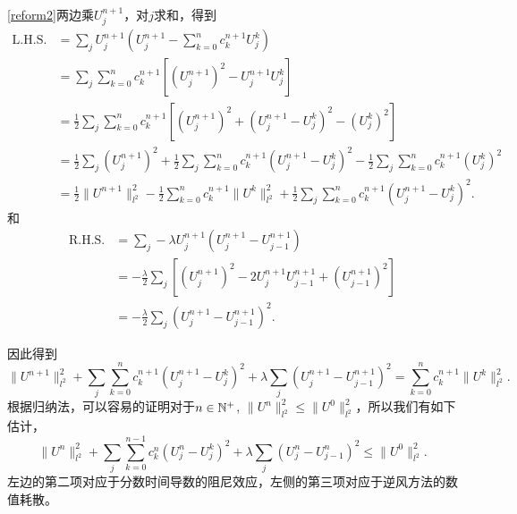 \eqref{reform2}两边乘$U_j^{n+1}$，对$j$求和，得到
\begin{align*}
\mbox{L.H.S.} &=\sum_j  U_j^{n+1} \left( U_j^{n+1}-\sum_{k=0}^{n} c^{n+1}_k U_j^k \right) \\
&= \sum_j \sum_{k=0}^{n} c^{n+1}_k  \left[ \left( U_j^{n+1} \right)^2 -U_j^{n+1}U_j^{k}  \right] \\
&= \frac{1}{2} \sum_j \sum_{k=0}^{n}  c^{n+1}_k   \left[ \left( U_j^{n+1} \right)^2 + \left( U_j^{n+1}-U_j^{k} \right)^2 -  \left( U_j^{k} \right)^2  \right] \\
& = \frac{1}{2}  \sum_j \left( U_j^{n+1} \right)^2 + \frac{1}{2} \sum_j \sum_{k=0}^{n} c^{n+1}_k \left( U_j^{n+1}-U_j^{k} \right)^2 -  \frac{1}{2} \sum_j \sum_{k=0}^{n}  c^{n+1}_k \left( U_j^{k} \right)^2  \\
& =\frac{1}{2} \| U^{n+1} \|_{l^2}^2 - \frac 1 2 \sum_{k=0}^{n}  c^{n+1}_k \|U^k \|_{l^2}^2 + \frac{1}{2} \sum_j \sum_{k=0}^{n} c^{n+1}_k \left( U_j^{n+1}-U_j^{k} \right)^2.
\end{align*}
和
\begin{align*}
\mbox{R.H.S.} &=\sum_j  -\lambda  U_j^{n+1} \left(U^{n+1}_j-U^{n+1}_{j-1}\right)  \\
& = -\frac \lambda 2 \sum_j \left[ \left( U_j^{n+1}\right)^2 -2 U_j^{n+1} U_{j-1}^{n+1}+\left( U_{j-1}^{n+1}\right)^2 \right] \\
& = -\frac \lambda 2 \sum_j \left(  U_j^{n+1} - U_{j-1}^{n+1} \right)^2.
\end{align*}

因此得到
\[
\| U^{n+1} \|_{l^2}^2 + \sum_j \sum_{k=0}^{n} c^{n+1}_k \left( U_j^{n+1}-U_j^{k} \right)^2+ \lambda  \sum_j \left(  U_j^{n+1} - U_{j-1}^{n+1} \right)^2 = \sum_{k=0}^{n}  c^{n+1}_k \|U^k \|_{l^2}^2.
\]
根据归纳法，可以容易的证明对于$n\in {\mathbb{N}}^+$, $\| U^{n} \|_{l^2}^2  \le   \| U^{0} \|_{l^2}^2 $，所以我们有如下估计，
\[
 \| U^{n} \|_{l^2}^2 + \sum_j  \sum_{k=0}^{n-1} c^{n}_k \left( U_j^{n}-U_j^{k} \right)^2+ \lambda \sum_j  \left(  U_j^{n} - U_{j-1}^{n} \right)^2 \le   \| U^{0} \|_{l^2}^2 .
\]
左边的第二项对应于分数时间导数的阻尼效应，左侧的第三项对应于逆风方法的数值耗散。



